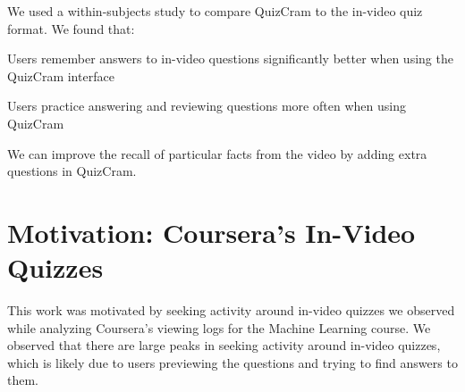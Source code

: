 \documentclass{sigchi}
\begin{document}
We used a within-subjects study to compare QuizCram to the in-video quiz format. We found that:


\begin{compactitem}
\item Users remember answers to in-video questions significantly better when using the QuizCram interface
\item Users practice answering and reviewing questions more often when using QuizCram
\item We can improve the recall of particular facts from the video by adding extra questions in QuizCram.
\end{compactitem}


\section{Motivation: Coursera's In-Video Quizzes}


This work was motivated by seeking activity around in-video quizzes we observed while analyzing Coursera's viewing logs for the Machine Learning course. We observed that there are large peaks in seeking activity around in-video quizzes, which is likely due to users previewing the questions and trying to find answers to them. %

\end{document}
